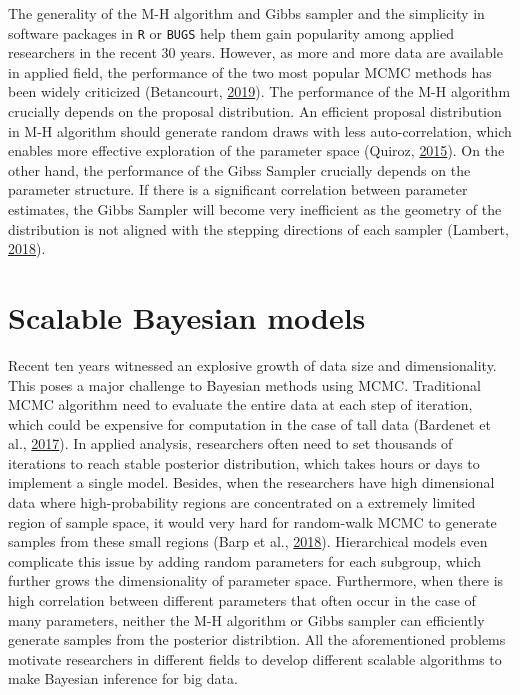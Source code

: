 \documentclass[12pt]{book}
\numberwithin{equation}{chapter}
\begin{document}
The generality of the M-H algorithm and Gibbs sampler and the simplicity in software packages in \texttt{R} or \texttt{BUGS} help them gain popularity among applied researchers in the recent 30 years. However, as more and more data are available in applied field, the performance of the two most popular MCMC methods has been widely criticized (Betancourt, \protect\hyperlink{ref-betancourt2019convergence}{2019}). The performance of the M-H algorithm crucially depends on the proposal distribution. An efficient proposal distribution in M-H algorithm should generate random draws with less auto-correlation, which enables more effective exploration of the parameter space (Quiroz, \protect\hyperlink{ref-quiroz2015bayesian}{2015}). On the other hand, the performance of the Gibss Sampler crucially depends on the parameter structure. If there is a significant correlation between parameter estimates, the Gibbs Sampler will become very inefficient as the geometry of the distribution is not aligned with the stepping directions of each sampler (Lambert, \protect\hyperlink{ref-lambert2018student}{2018}).

\hypertarget{scalable-bayesian-models}{%
\section{Scalable Bayesian models}\label{scalable-bayesian-models}}

Recent ten years witnessed an explosive growth of data size and dimensionality. This poses a major challenge to Bayesian methods using MCMC. Traditional MCMC algorithm need to evaluate the entire data at each step of iteration, which could be expensive for computation in the case of tall data (Bardenet et al., \protect\hyperlink{ref-bardenet2017markov}{2017}). In applied analysis, researchers often need to set thousands of iterations to reach stable posterior distribution, which takes hours or days to implement a single model. Besides, when the researchers have high dimensional data where high-probability regions are concentrated on a extremely limited region of sample space, it would very hard for random-walk MCMC to generate samples from these small regions (Barp et al., \protect\hyperlink{ref-barp2018geometry}{2018}). Hierarchical models even complicate this issue by adding random parameters for each subgroup, which further grows the dimensionality of parameter space. Furthermore, when there is high correlation between different parameters that often occur in the case of many parameters, neither the M-H algorithm or Gibbs sampler can efficiently generate samples from the posterior distribtion. All the aforementioned problems motivate researchers in different fields to develop different scalable algorithms to make Bayesian inference for big data.
\end{document}
